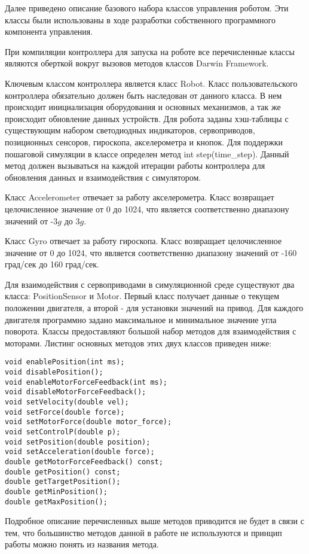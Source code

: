 Далее приведено описание базового набора классов управления роботом. Эти классы были использованы в ходе разработки собственного программного компонента управления.

При компиляции контроллера для запуска на роботе все перечисленные классы являются оберткой вокруг вызовов методов классов Darwin Framework.

Ключевым классом контроллера является класс Robot. Класс пользовательского контроллера обязательно должен быть наследован от данного класса. В нем происходит инициализация оборудования и основных механизмов, а так же происходит обновление данных устройств. Для робота заданы хэш-таблицы с существующим набором светодиодных индикаторов, сервоприводов, позиционных сенсоров, гироскопа, акселерометра и кнопок. Для поддержки пошаговой симуляции в классе определен метод int step(time\_step). Данный метод должен вызываться на каждой итерации работы контроллера для обновления данных и взаимодействия с симулятором.

Класс Accelerometer отвечает за работу акселерометра. Класс возвращает целочисленное значение от 0 до 1024, что является соответственно диапазону значений от -3$g$ до 3$g$.

Класс Gyro отвечает за работу гироскопа. Класс возвращает целочисленное значение от 0 до 1024, что является соответственно диапазону значений от -160 град/сек до 160 град/сек.

Для взаимодействия с сервоприводами в симуляционной среде существуют два класса: PositionSensor и Motor. Первый класс получает данные о текущем положении двигателя, а второй - для установки значений на привод. Для каждого двигателя программно задано максимальное и минимальное значение угла поворота. Классы предоставляют большой набор методов для взаимодействия с моторами. Листинг основных методов этих двух классов приведен ниже:

\lstset{language=C++}
\begin{lstlisting}
void enablePosition(int ms);
void disablePosition();
void enableMotorForceFeedback(int ms);
void disableMotorForceFeedback();
void setVelocity(double vel);
void setForce(double force);
void setMotorForce(double motor_force);
void setControlP(double p);
void setPosition(double position);
void setAcceleration(double force);
double getMotorForceFeedback() const;
double getPosition() const;
double getTargetPosition();
double getMinPosition();
double getMaxPosition();
\end{lstlisting}

Подробное описание перечисленных выше методов приводится не будет в связи с тем, что большинство методов данной в работе не используются и принцип работы можно понять из названия метода.

